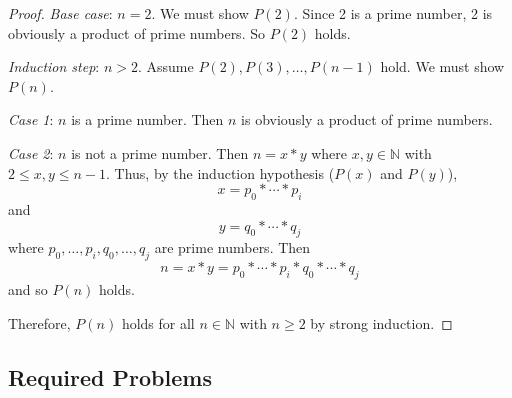 \documentclass[11pt,fleqn]{article}
\begin{document}
\begin{enumerate}
\begin{proof}
\medskip

\emph{Base case}: $n = 2$.  We must show $P(2)$.  Since 2 is a prime
number, 2 is obviously a product of prime numbers.  So $P(2)$ holds.

\medskip

\emph{Induction step}: $n > 2$.  Assume $P(2), P(3), \ldots, P(n-1)$
hold.  We must show $P(n)$.

\emph{Case 1}: $n$ is a prime number.  Then $n$ is obviously a product
of prime numbers.

\emph{Case 2}: $n$ is not a prime number.  Then $n = x * y$ where $x,y
\in \mathbb{N}$ with $2 \le x,y \le n - 1$.  Thus, by the induction
hypothesis ($P(x)$ and $P(y)$), \[x = p_0 * \cdots *p_i\] and \[y =
q_0 * \cdots *q_j\] where $p_0,\ldots,p_i,q_0,\ldots,q_j$ are prime
numbers.  Then \[n = x * y = p_0 * \cdots * p_i * q_0 * \cdots * q_j\]
and so $P(n)$ holds.

\medskip

Therefore, $P(n)$ holds for all $n \in \mathbb{N}$ with $n \ge 2$ by
strong induction.
\end{proof}

\end{enumerate}

\newpage

\subsection*{Required Problems}
\end{document}
